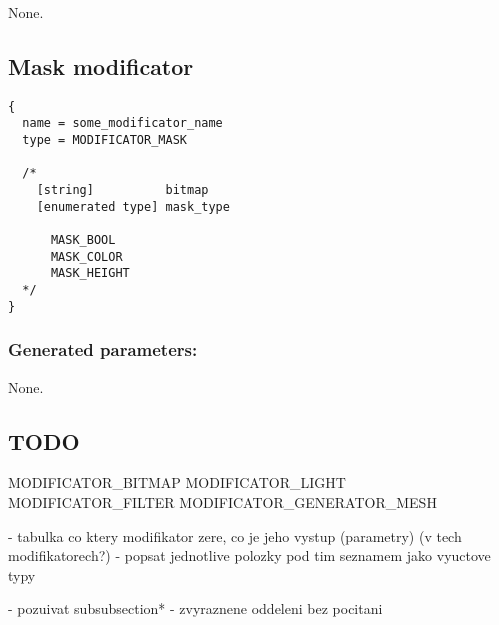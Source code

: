\documentclass[9pt]{article}
\begin{document}
None.

\subsection{Mask modificator}

\begin{verbatim}
{
  name = some_modificator_name
  type = MODIFICATOR_MASK

  /*
    [string]          bitmap      
    [enumerated type] mask_type
  
      MASK_BOOL
      MASK_COLOR
      MASK_HEIGHT
  */
}
\end{verbatim}

\subsubsection*{Generated parameters:}

None.

\subsection{TODO}
MODIFICATOR\_BITMAP
MODIFICATOR\_LIGHT
MODIFICATOR\_FILTER
MODIFICATOR\_GENERATOR\_MESH

- tabulka co ktery modifikator zere, co je jeho vystup (parametry)
(v tech modifikatorech?)
- popsat jednotlive polozky pod tim seznamem jako
vyuctove typy

- pozuivat subsubsection*{} - zvyraznene oddeleni bez pocitani
\end{document}
